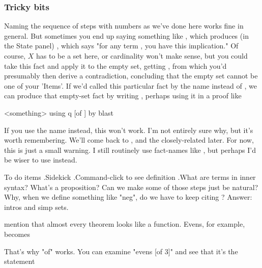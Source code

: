 \subsubsection*{Tricky bits}
Naming the sequence of steps with numbers as we've done here works fine in general. But sometimes you end up saying something like
, which produces (in the State panel) , which says "for any term , you have this implication." Of course, $X$ has to be a set here, or cardinality won't make sense, but you could take this fact and apply it to the empty set, getting , from which you'd presumably then derive a contradiction, concluding that the empty set cannot be one of your 'Items'. If we'd called this particular fact by the name  instead of , we can produce that empty-set fact by writing , perhaps using it in a proof like
\begin{IS}
    <something> using q [of {}] by blast
\end{IS}

If you use the name  instead, this won't work. I'm not entirely sure why, but it's worth remembering. We'll come back to , and the closely-related  later. For now, this is just a small warning. I still routinely use fact-names like , but perhaps I'd be wiser to use  instead. 

To do items
.Sidekick
.Command-click to see definition
.What are terms in inner syntax? What's a proposition? 
Can we make some of those steps just be natural? Why, when we define something like "neg", do we have to keep citing ? Answer: intros and simp sets. 

mention that almost every theorem looks like a function. Evens, for example, becomes

That's why "of" works. You can examine "evens [of 3]" and see that it's the statement



